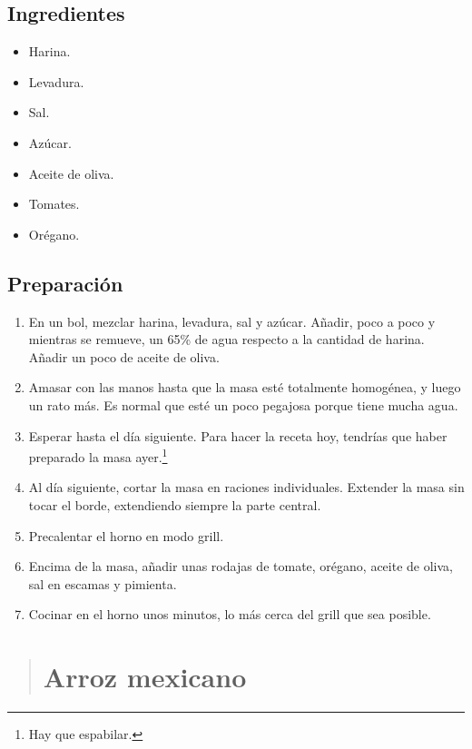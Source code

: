 \documentclass[
]{book}
\providecommand{\tightlist}{%
  \setlength{\itemsep}{0pt}\setlength{\parskip}{0pt}}
\begin{document}
\hypertarget{ingredientes-10}{%
\section*{Ingredientes}\label{ingredientes-10}}

\begin{itemize}
\tightlist
\item
  Harina.
\item
  Levadura.
\item
  Sal.
\item
  Azúcar.
\item
  Aceite de oliva.
\item
  Tomates.
\item
  Orégano.
\end{itemize}

\hypertarget{preparaciuxf3n-10}{%
\section*{Preparación}\label{preparaciuxf3n-10}}

\begin{enumerate}
\def\labelenumi{\arabic{enumi}.}
\tightlist
\item
  En un bol, mezclar harina, levadura, sal y azúcar. Añadir, poco a poco y mientras se remueve, un 65\% de agua respecto a la cantidad de harina. Añadir un poco de aceite de oliva.
\item
  Amasar con las manos hasta que la masa esté totalmente homogénea, y luego un rato más. Es normal que esté un poco pegajosa porque tiene mucha agua.
\item
  Esperar hasta el día siguiente. Para hacer la receta hoy, tendrías que haber preparado la masa ayer.\footnote{Hay que espabilar.}
\item
  Al día siguiente, cortar la masa en raciones individuales. Extender la masa sin tocar el borde, extendiendo siempre la parte central.
\item
  Precalentar el horno en modo grill.
\item
  Encima de la masa, añadir unas rodajas de tomate, orégano, aceite de oliva, sal en escamas y pimienta.
\item
  Cocinar en el horno unos minutos, lo más cerca del grill que sea posible.
\end{enumerate}

\begin{quote}
\hypertarget{arroz-mexicano}{%
\chapter{Arroz mexicano}\label{arroz-mexicano}}
\end{quote}
\end{document}
